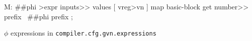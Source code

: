 \centering

  \begin{factorcode}
    M: ##phi >expr
        inputs>> values [ vreg>vn ] map
        basic-block get number>> prefix
        \ ##phi prefix ;
  \end{factorcode}

\caption{$\phi$ expressions in \texttt{compiler.cfg.gvn.expressions}}
